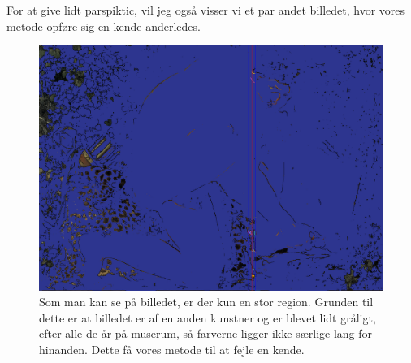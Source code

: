 For at give lidt parspiktic, vil jeg også visser vi et par andet billedet, hvor
vores metode opføre sig en kende anderledes.
	
\begin{figure}[h!!]
	\begin{center}
		\includegraphics[scale=0.20,angle=0]{afsnit/afprovning/billeder/nicofloodfillbilledet.png}
	\end{center}
	\caption[]{Som man kan se på billedet, er der kun en stor region.
	           Grunden til dette er at billedet er af en anden kunstner
	           og er blevet lidt gråligt, efter alle de år på muserum,
	           så farverne ligger ikke særlige lang for hinanden. Dette
	           få vores metode til at fejle en kende.}
	\label{nicofill}
\end{figure}


